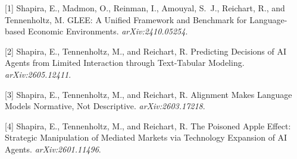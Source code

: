 \documentclass{article}
\begin{document}
\small

[1] Shapira, E., Madmon, O., Reinman, I., Amouyal, S.\ J., Reichart, R., and Tennenholtz, M. GLEE: A Unified Framework and Benchmark for Language-based Economic Environments. \emph{arXiv:2410.05254}.

[2] Shapira, E., Tennenholtz, M., and Reichart, R. Predicting Decisions of AI Agents from Limited Interaction through Text-Tabular Modeling. \emph{arXiv:2605.12411}.

[3] Shapira, E., Tennenholtz, M., and Reichart, R. Alignment Makes Language Models Normative, Not Descriptive. \emph{arXiv:2603.17218}.

[4] Shapira, E., Tennenholtz, M., and Reichart, R. The Poisoned Apple Effect: Strategic Manipulation of Mediated Markets via Technology Expansion of AI Agents. \emph{arXiv:2601.11496}.
\end{document}
